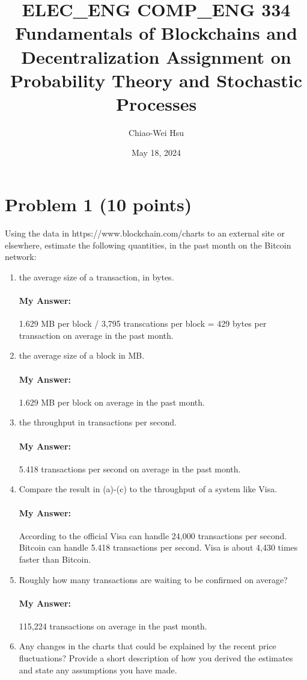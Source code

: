 \documentclass{article}
\title{ELEC\_ENG COMP\_ENG 334 Fundamentals of Blockchains and Decentralization Assignment on Probability Theory and Stochastic Processes}
\author{Chiao-Wei Hsu}
\date{May 18, 2024}
\begin{document}
\maketitle

\section{Problem 1 (10 points)}

Using the data in https://www.blockchain.com/charts to an external site or elsewhere, estimate the following quantities, in the past month on the Bitcoin network:

\begin{enumerate}[label=(\alph*)]
    \item the average size of a transaction, in bytes.
        \paragraph*{My Answer:} 1.629 MB per block / 3,795 transcations per block = 429 bytes per transaction on average in the past month.
    \item the average size of a block in MB.
        \paragraph*{My Answer:} 1.629 MB per block on average in the past month.
    \item the throughput in transactions per second.
        \paragraph*{My Answer:} 5.418 transactions per second on average in the past month.
    \item Compare the result in (a)-(c) to the throughput of a system like Visa.
        \paragraph*{My Answer:} According to the official Visa can handle 24,000 transactions per second. Bitcoin can handle 5.418 transactions per second. Visa is about 4,430 times faster than Bitcoin.
    \item Roughly how many transactions are waiting to be confirmed on average?
        \paragraph*{My Answer:} 115,224 transactions on average in the past month.
    \item Any changes in the charts that could be explained by the recent price fluctuations? Provide a short description of how you derived the estimates and state any assumptions you have made.

\end{enumerate}
\end{document}
